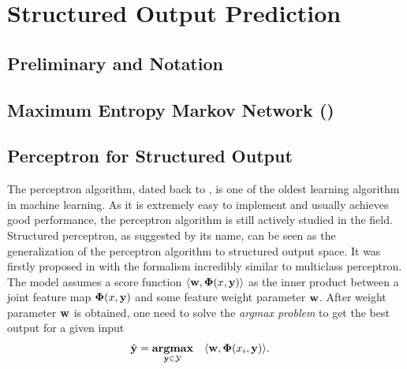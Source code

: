 


\section{Structured Output Prediction}

%
\subsection{Preliminary and Notation}


%
\subsection{Maximum Entropy Markov Network (\memm)}


%
\subsection{Perceptron for Structured Output}

The perceptron algorithm, dated back to \citep{Rosenblatt58}, is one of the oldest learning algorithm in machine learning.
As it is extremely easy to implement and usually achieves good performance, the perceptron algorithm is still actively studied in the field.
Structured perceptron, as suggested by its name, can be seen as the generalization of the perceptron algorithm to structured output space.
It was firstly proposed in \citep{collins02a, collins02b} with the formalism incredibly similar to multiclass perceptron. 
The model assumes a score function $\langle \mathbf {w}, \mathbf{\Phi}(x,\mathbf {y}) \rangle$ as the inner product between a joint feature map $\mathbf{\Phi}(x,\mathbf {y})$ and some feature weight parameter $\mathbf {w}$.
After weight parameter $\mathbf {w}$ is obtained, one need to solve the \textit{argmax problem} to get the best output for a given input
\begin{align}
	\hat{\mathbf {y}} = \underset{\mathbf {y}\in\mathcal{Y}}{\textbf{argmax}} &\quad \langle \mathbf {w}, \mathbf{\Phi}(x_i,\mathbf {y}) \rangle.  \label{perceptroninference}
\end{align}

